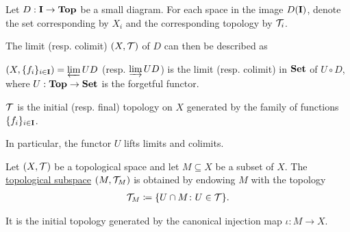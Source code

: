 \begin{proposition}\label{thm:initial_final_topology_limit}\cite{nLab:top}
  Let $D: \operatorname{\mathbf{I}} \to \operatorname{\mathbf{Top}}$ be a small diagram. For each space in the image $D(\operatorname{\mathbf{I}})$, denote the set corresponding by $X_i$ and the corresponding topology by $\mathcal T_i$.

  The limit (resp. colimit) $(X, \mathcal T)$ of $D$ can then be described as
  \begin{defenum}
    \item $(X, \{ f_i \}_{i \in \operatorname{\mathbf{I}}}) = \varprojlim UD$ (resp. $\varinjlim UD$) is the limit (resp. colimit) in $\operatorname{\mathbf{Set}}$ of $U \circ D$, where $U: \operatorname{\mathbf{Top}} \to \operatorname{\mathbf{Set}}$ is the forgetful functor.
    \item $\mathcal T$ is the initial (resp. final) topology on $X$ generated by the family of functions $\{ f_i \}_{i \in \operatorname{\mathbf{I}}}$.
  \end{defenum}

  In particular, the functor $U$ lifts limits and colimits.
\end{proposition}

\begin{definition}\label{def:topological_subspace}
  Let $(X, \mathcal T)$ be a topological space and let $M \subseteq X$ be a subset of $X$. The \ul{topological subspace} $(M, \mathcal T_M)$ is obtained by endowing $M$ with the topology
  \begin{align*}
    \mathcal T_M \coloneqq \{ U \cap M \colon U \in \mathcal T \}.
  \end{align*}

  It is the initial topology generated by the canonical injection map $\iota: M \to X$.
\end{definition}


